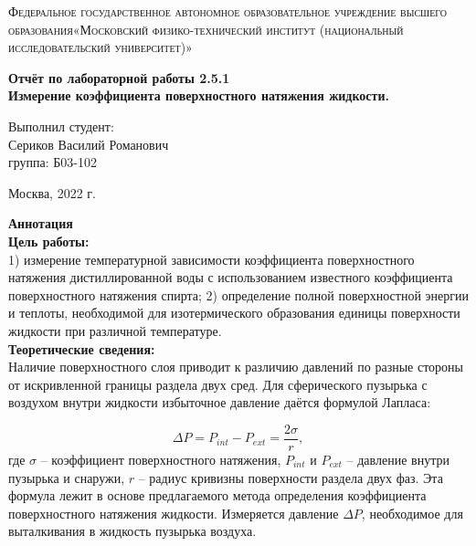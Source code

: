 \documentclass[a4paper, 12pt]{article}%
\begin{document}
	\begin{titlepage}
		\begin{center}
			\textsc{Федеральное государственное автономное образовательное учреждение высшего образования«Московский физико-технический институт (национальный исследовательский университет)»\\[5mm]
			}
			
			\vfill
			
			\textbf{Отчёт по лабораторной работы 2.5.1\\[3mm]
				Измерение коэффициента поверхностного натяжения жидкости.
				\\[50mm]
			}
			
		\end{center}
		
		\hfill
		\begin{minipage}{.5\textwidth}
			Выполнил студент:\\[2mm]
			Сериков Василий Романович\\[2mm]
			группа: Б03-102\\[5mm]
			
		\end{minipage}
		\vfill
		\begin{center}
			Москва, 2022 г.
		\end{center}
		
	\end{titlepage}
	
	\newpage
	\textbf{Аннотация}\\
	
	
	\textbf{Цель работы: }\\
	
1) измерение температурной зависимости коэффициента поверхностного
натяжения дистиллированной воды с использованием известного коэффициента
поверхностного натяжения спирта; 2) определение полной поверхностной энергии и
теплоты, необходимой для изотермического образования единицы поверхности жидкости
при различной температуре.\\
	
	
	\textbf{Теоретические сведения: } \\

	
	Наличие поверхностного слоя приводит к различию давлений по разные стороны от искривленной границы раздела двух сред.  Для сферического пузырька с воздухом  внутри жидкости избыточное давление даётся формулой Лапласа:
	
	\begin{equation}\label{key}
		\Delta P = P_{int} - P_{ext} = \frac{2\sigma}{r},
	\end{equation}
	где $ \sigma $ -- коэффициент поверхностного натяжения, $ P_{int} $ и $ P_{ext} $ -- давление внутри пузырька и снаружи, $ r $ -- радиус кривизны поверхности раздела двух фаз. Эта формула лежит в основе предлагаемого метода определения коэффициента поверхностного натяжения жидкости. Измеряется давление $ \Delta P $, необходимое для выталкивания в жидкость пузырька воздуха.\\
	
\end{document}
